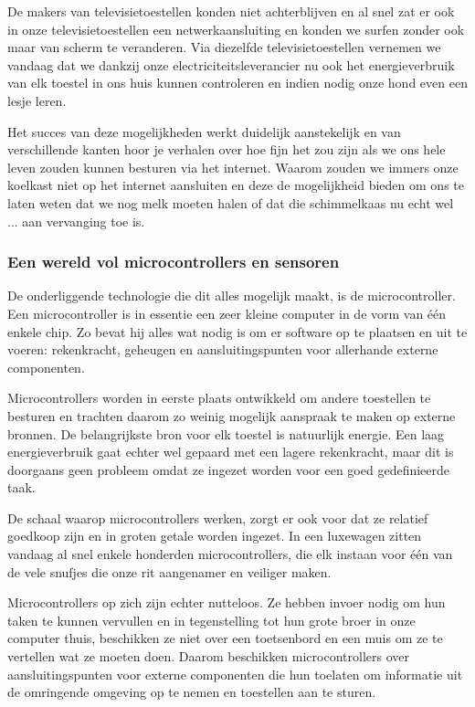 \documentclass[DIV=calc,paper=a4,fontsize=11pt,twocolumn,draft]{scrartcl}
\newcommand{\heading}[1]{
\subsubsection*{#1}
\vspace{-2mm}
}
\begin{document}
De makers van televisietoestellen konden niet achterblijven en al snel zat er
ook in onze televisietoestellen een netwerkaansluiting en konden we surfen
zonder ook maar van scherm te veranderen. Via diezelfde televisietoestellen
vernemen we vandaag dat we dankzij onze electriciteitsleverancier nu ook het
energieverbruik van elk toestel in ons huis kunnen controleren en indien nodig
onze hond even een lesje leren.

Het succes van deze mogelijkheden werkt duidelijk aanstekelijk en van
verschillende kanten hoor je verhalen over hoe fijn het zou zijn als we ons
hele leven zouden kunnen besturen via het internet. Waarom zouden we immers
onze koelkast niet op het internet aansluiten en deze de mogelijkheid bieden om
ons te laten weten dat we nog melk moeten halen of dat die schimmelkaas nu echt
wel ... aan vervanging toe is.

\heading{Een wereld vol microcontrollers en sensoren}

De onderliggende technologie die dit alles mogelijk maakt, is de
microcontroller. Een microcontroller is in essentie een zeer kleine computer in
de vorm van \'e\'en enkele chip. Zo bevat hij alles wat nodig is om er software
op te plaatsen en uit te voeren: rekenkracht, geheugen en aansluitingspunten
voor allerhande externe componenten.

Microcontrollers worden in eerste plaats ontwikkeld om andere toestellen te
besturen en trachten daarom zo weinig mogelijk aanspraak te maken op externe
bronnen. De belangrijkste bron voor elk toestel is natuurlijk energie. Een laag
energieverbruik gaat echter wel gepaard met een lagere rekenkracht, maar dit is
doorgaans geen probleem omdat ze ingezet worden voor een goed gedefinieerde
taak.

De schaal waarop microcontrollers werken, zorgt er ook voor dat ze relatief
goedkoop zijn en in groten getale worden ingezet. In een luxewagen zitten
vandaag al snel enkele honderden microcontrollers, die elk instaan voor \'e\'en
van de vele snufjes die onze rit aangenamer en veiliger maken.

Microcontrollers op zich zijn echter nutteloos. Ze hebben invoer nodig om hun
taken te kunnen vervullen en in tegenstelling tot hun grote broer in onze
computer thuis, beschikken ze niet over een toetsenbord en een muis om ze te
vertellen wat ze moeten doen. Daarom beschikken microcontrollers over
aansluitingspunten voor externe componenten die hun toelaten om informatie uit
de omringende omgeving op te nemen en toestellen aan te sturen.
\end{document}
